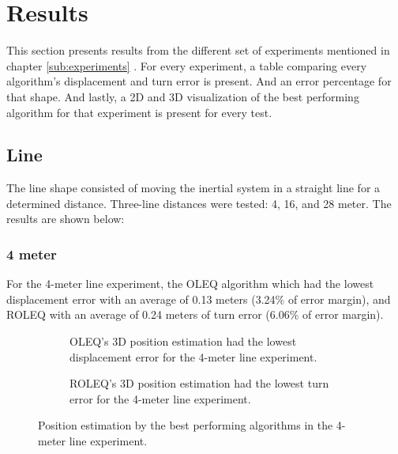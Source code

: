 \section{Results}

This section presents results from the different set of experiments mentioned in chapter \ref{sub:experiments} . For every experiment, a table comparing every algorithm's displacement and turn error is present. And an error percentage for that shape. And lastly, a 2D and 3D visualization of the best performing algorithm for that experiment is present for every test.

\subsection{Line}

The line shape consisted of moving the inertial system in a straight line for a determined distance. Three-line distances were tested: 4, 16, and 28 meter. The results are shown below:

\subsubsection{4 meter}

For the 4-meter line experiment, the OLEQ algorithm which had the lowest displacement error with an average of 0.13 meters (3.24\% of error margin), and ROLEQ with an average of 0.24 meters of turn error (6.06\% of error margin).



\begin{figure}[H]
    \centering
    \begin{subfigure}{0.49\textwidth}
        \centering
        \resizebox{1\linewidth}{!}{}
        \caption{ OLEQ's 3D position estimation had the lowest displacement error for the 4-meter line experiment. }
        \label{fig:line4_2D}
    \end{subfigure}
    \begin{subfigure}{0.49\textwidth}
        \centering
        \resizebox{1\linewidth}{!}{}
        \caption{ ROLEQ's 3D position estimation had the lowest turn error for the 4-meter line experiment. }
        \label{fig:line4_3D}
    \end{subfigure}
    \caption{Position estimation by the best performing algorithms in the 4-meter line experiment.}
    \label{fig:line4}
\end{figure}

